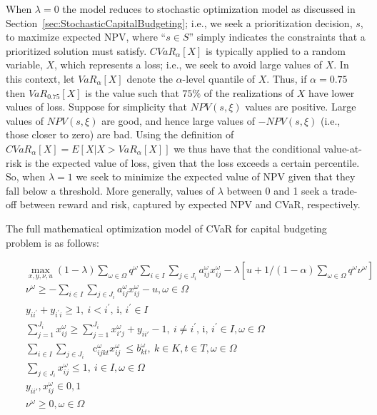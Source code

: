 When $\lambda = 0$ the model reduces to stochastic optimization model as
discussed in Section~\ref{sec:StochasticCapitalBudgeting}; i.e., we seek
a prioritization decision, $s$, to maximize expected NPV, where ``$s \in S$''
simply indicates the constraints that a prioritized solution must satisfy.
$CVaR_\alpha [X]$ is typically applied to a random variable, $X$, which
represents a loss; i.e., we seek to avoid large values of $X$. In this
context, let $VaR_\alpha [X]$ denote the $\alpha$-level quantile of $X$.
Thus, if $\alpha = 0.75$ then $VaR_0.75 [X]$ is the value such that $75\%$
of the realizations of $X$ have lower values of loss. Suppose for simplicity
that $NPV(s, \xi)$ values are positive. Large values of $NPV(s, \xi)$ are
good, and hence large values of $-NPV(s, \xi)$ (i.e., those closer to zero)
are bad. Using the definition of $CVaR_\alpha [X] = E[X|X > VaR_\alpha [X]]$
we thus have that the conditional value-at-risk is the expected value of loss,
given that the loss exceeds a certain percentile. So, when $\lambda = 1$ we
seek to minimize the expected value of NPV given that they fall below a
threshold. More generally, values of $\lambda$ between 0 and 1 seek a trade-off
between reward and risk, captured by expected NPV and CVaR, respectively.

The full mathematical optimization model of CVaR for capital budgeting problem
is as follows:

\begin{subequations}\label{fullCVaR}
\begin{eqnarray}
& & \max_{x, y, \nu, u} (1-\lambda) \sum _{ \omega  \in  \Omega }^{}q^{ \omega } \sum _{i \in I}^{} \sum _{j \in J_{i}}^{}a_{ij}^{ \omega }x_{ij}^{ \omega } - \lambda[u+1/(1-\alpha)\sum_{\omega \in \Omega} q^\omega \nu^\omega] \\
& & \nu^\omega \ge - \sum _{i \in I}^{} \sum _{j \in J_{i}}^{}a_{ij}^{ \omega }x_{ij}^{ \omega } - u, \omega \in \Omega \\
& & y_{ii^{'}}+y_{i^{'}i} \geq 1,~ i<i^{'}\text{, i, }i^{'} \in I \\
& & \sum_{j=1}^{J_i} x_{ij}^\omega \geq \sum_{j=1}^{J_i} x_{i'j}^\omega + y_{ii'} -1,~ i \neq i^{'}\text{, i, }i^{'} \in I,  \omega  \in  \Omega \\
& & \sum _{i \in I}^{} \sum _{j \in J_{i}}^{}\text{~ c}_{ijkt}^{ \omega }x_{ij}^{ \omega }~  \leq  b_{kt}^{ \omega },~ k \in K, t \in T,  \omega  \in  \Omega \\
& & \sum_{j\in J_i} x_{ij}^{ \omega } \leq 1,~ i \in I, \omega  \in  \Omega \\
& & y_{ii'}, x_{ij}^\omega \in {0, 1} \\
& & \nu^\omega \ge 0, \omega \in \Omega
\end{eqnarray}
\end{subequations}

